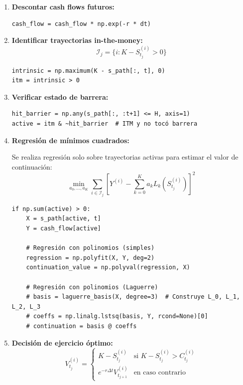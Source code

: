 \begin{enumerate}
    \item \textbf{Descontar cash flows futuros:}
    \begin{verbatim}
cash_flow = cash_flow * np.exp(-r * dt)
    \end{verbatim}
    
    \item \textbf{Identificar trayectorias in-the-money:}
    \begin{equation}
    \mathcal{I}_j = \{i : K - S_{t_j}^{(i)} > 0\}
    \end{equation}
    \begin{verbatim}
intrinsic = np.maximum(K - s_path[:, t], 0)
itm = intrinsic > 0
    \end{verbatim}
    
    \item \textbf{Verificar estado de barrera:}
    \begin{verbatim}
hit_barrier = np.any(s_path[:, :t+1] <= H, axis=1)
active = itm & ~hit_barrier  # ITM y no tocó barrera
    \end{verbatim}
    
    \item \textbf{Regresión de mínimos cuadrados:}
    
    Se realiza regresión solo sobre trayectorias activas para estimar el valor de continuación:
    \begin{equation}
    \min_{a_0, \ldots, a_K} \sum_{i \in \mathcal{I}_j} \left[Y^{(i)} - \sum_{k=0}^{K} a_k L_k(S_{t_j}^{(i)})\right]^2
    \end{equation}
    
    \begin{verbatim}
if np.sum(active) > 0:
    X = s_path[active, t]
    Y = cash_flow[active]
    
    # Regresión con polinomios (simples)
    regression = np.polyfit(X, Y, deg=2)
    continuation_value = np.polyval(regression, X)

    # Regresión con polinomios (Laguerre)
    # basis = laguerre_basis(X, degree=3)  # Construye L_0, L_1, L_2, L_3
    # coeffs = np.linalg.lstsq(basis, Y, rcond=None)[0]
    # continuation = basis @ coeffs
    \end{verbatim}
    
    \item \textbf{Decisión de ejercicio óptimo:}
    \begin{equation}
    V_{t_j}^{(i)} = \begin{cases}
    K - S_{t_j}^{(i)} & \text{si } K - S_{t_j}^{(i)} > C_{t_j}^{(i)} \\
    e^{-r\Delta t} V_{t_{j+1}}^{(i)} & \text{en caso contrario}
    \end{cases}
    \end{equation}
    

\end{enumerate}
